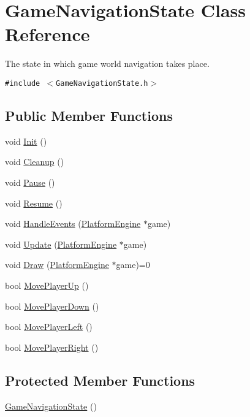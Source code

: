 \hypertarget{class_game_navigation_state}{
\section{GameNavigationState Class Reference}
\label{class_game_navigation_state}
}
The state in which game world navigation takes place.  


{\tt \#include $<$GameNavigationState.h$>$}

\subsection*{Public Member Functions}
\begin{CompactItemize}
\item 
void \hyperlink{class_game_navigation_state_8f613860bf544476ab9cff9fb7f98201}{Init} ()
\item 
void \hyperlink{class_game_navigation_state_f93a7dbb7eac4b14a6d59cbca32b9abd}{Cleanup} ()
\item 
void \hyperlink{class_game_navigation_state_ac626b511de8af9f32b7a1492a10f861}{Pause} ()
\item 
void \hyperlink{class_game_navigation_state_4d6aee55eddb1978f493206d985fb950}{Resume} ()
\item 
void \hyperlink{class_game_navigation_state_1903be15338da11029cb5ec22729bce2}{HandleEvents} (\hyperlink{class_platform_engine}{PlatformEngine} $\ast$game)
\item 
void \hyperlink{class_game_navigation_state_90f5e6d6287a875d8f2737180f46a004}{Update} (\hyperlink{class_platform_engine}{PlatformEngine} $\ast$game)
\item 
void \hyperlink{class_game_navigation_state_06e4fc064c040cf230fb425bfe9eb96c}{Draw} (\hyperlink{class_platform_engine}{PlatformEngine} $\ast$game)=0
\item 
bool \hyperlink{class_game_navigation_state_fd803365fe0a32b60cf9105ee45b4042}{MovePlayerUp} ()
\item 
bool \hyperlink{class_game_navigation_state_66f8a21e63270473d88b31b06d306111}{MovePlayerDown} ()
\item 
bool \hyperlink{class_game_navigation_state_b8ee346a4f4be2cc3478fdacfb770464}{MovePlayerLeft} ()
\item 
bool \hyperlink{class_game_navigation_state_0b505a64bcf97883bb9e15d0d008174e}{MovePlayerRight} ()
\end{CompactItemize}
\subsection*{Protected Member Functions}
\begin{CompactItemize}
\item 
\hyperlink{class_game_navigation_state_6a3b93831c85eb5dc3de0a53ca13ddfc}{GameNavigationState} ()
\end{CompactItemize}
